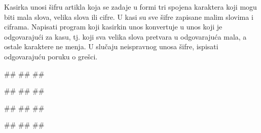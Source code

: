 \begin{Exercise}[label=KT_NG_11] 
Kasirka unosi šifru artikla koja se zadaje u formi tri spojena karaktera koji mogu biti mala slova, velika slova ili cifre. 
U kasi su sve šifre zapisane malim slovima i ciframa. Napisati program koji kasirkin unos konvertuje u unos
koji je odgovarajući za kasu, tj. koji sva velika slova pretvara u odgovarajuća mala, a ostale karaktere ne menja. 
U slučaju neispravnog unosa šifre, ispisati odgovarajuću poruku o grešci.

\begin{miditest}
\begin{upotreba}{1}
#\naslovInt#
##
##
\end{upotreba}
\end{miditest}
\begin{miditest}
\begin{upotreba}{2}
#\naslovInt#
##
##
\end{upotreba}
\end{miditest}

\begin{miditest}
\begin{upotreba}{3}
#\naslovInt#
##
##
\end{upotreba}
\end{miditest}
\begin{miditest}
\begin{upotreba}{4}
#\naslovInt#
##
##
\end{upotreba}
\end{miditest}
\end{Exercise}
\ifresenja
 \begin{Answer}[ref=KT_NG_11]
\end{Answer}
\fi 


